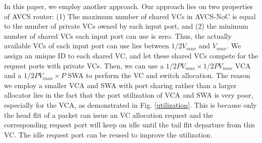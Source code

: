 \documentclass[10pt,conference]{IEEEtran}
\begin{document}
In this paper, we employ another approach. Our approach lies on two properties of AVCS router: (1) The maximum number of shared VCs in AVCS-NoC is equal to the number of private VCs owned by each input port, and (2) the minimum number of shared VCs each input port can use is zero. Thus, the actually available VCs of each input port can use lies between $1/2V_{max}$ and $V_{max}$. We assign an unique ID to each shared VC, and let these shared VCs compete for the request ports with private VCs. Then, we can use a $1/2PV_{max}\times 1/2PV_{max}$ VCA and a $1/2PV_{max}\times P$ SWA to perform the VC and switch allocation. The reason we employ a smaller VCA and SWA with port sharing rather than a larger allocator lies in the fact that the port utilization of VCA and SWA is very poor, especially for the VCA, as demonstrated in Fig. \ref{utilization}. This is because only the head flit of a packet can issue an VC allocation request and the corresponding request port will keep on idle until the tail flit departure from this VC. The idle request port can be reused to improve the utilization.

\end{document}

